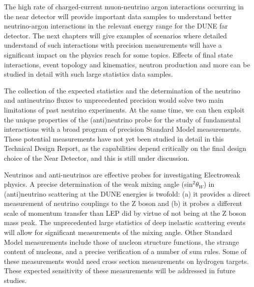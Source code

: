The high rate of charged-current muon-neutrino argon interactions occurring in 
the near detector will provide important data samples to understand better neutrino-argon 
interactions in the relevant energy range for the DUNE far detector. The next chapters
will give examples of scenarios where detailed understand of such interactions with 
precision measurements will have a significant impact on the physics reach for some
topics. Effects of final state interactions, event topology and kinematics, neutron production and more can be studied in detail with such large statistics 
data samples.

The collection of the expected statistics and the determination of the neutrino and
antineutrino fluxes to unprecedented precision would solve  two main limitations of past neutrino experiments. At the same time, we can then exploit the unique
properties of the (anti)neutrino probe for the study of fundamental interactions with a broad program of precision Standard Model measurements. These potential measurements
have not yet been studied in detail in this Technical Design Report, as the capabilities
depend critically on the final design choice of the Near Detector, and this is still under discussion.

Neutrinos and anti-neutrinos are effective probes for investigating Electroweak 
physics. A precise determination of the weak mixing angle (sin$^2\theta_W$) in (anti)neutrino
scattering at the DUNE energies is twofold: (a) it provides a direct measurement of neutrino
couplings to the Z boson and (b) it probes a different scale of momentum transfer than LEP
did by virtue of not being at the Z boson mass peak. The unprecedented large statistics
of deep inelastic scattering events will allow for significant measurements of the mixing 
angle. Other Standard Model measurements include those of nucleon structure functions, the strange content of nucleons, and a precise verification of a number of sum rules. 
Some of these measurements would need cross section measurements 
on hydrogen targets.  These expected sensitivity of these measurements will be addressed
in future studies.



